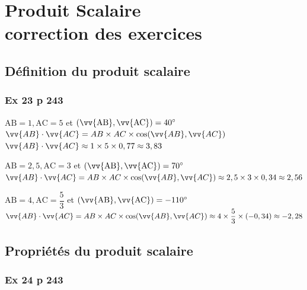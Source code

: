 \documentclass[12pt,a4paper]{book}
\begin{document}
\graphicspath{{images/}}
\setcounter{chapter}{2}
\chapter[Correction des exercices]{Produit Scalaire \\ correction des exercices}
\thispagestyle{fancy}

\section*{Définition du produit scalaire}

\subsection*{Ex 23 p 243}

\begin{enumMet}
    \item $\mathrm{AB}=1, \mathrm{AC}=5$ et $(\vv{\mathrm{AB}}, \vv{\mathrm{AC}})=40^{\circ}$\\
    $\vv{AB}\cdot\vv{AC}=AB\times AC\times\cos(\vv{AB},\vv{AC})$\\
    $\vv{AB}\cdot\vv{AC}\approx1\times5\times0,77\approx3,83$
    \item $\mathrm{AB}=2,5, \mathrm{AC}=3$ et $(\vv{\mathrm{AB}}, \vv{\mathrm{AC}})=70^{\circ}$\\
    $\vv{AB}\cdot\vv{AC}=AB\times AC\times\cos(\vv{AB},\vv{AC})\approx2,5\times3\times0,34\approx2,56$
    \item $\mathrm{AB}=4, \mathrm{AC}=\dfrac{5}{3}$ et $(\vv{\mathrm{AB}}, \vv{\mathrm{AC}})=-110^{\circ}$\\
    $\vv{AB}\cdot\vv{AC}=AB\times AC\times\cos(\vv{AB},\vv{AC})\approx4\times\dfrac{5}{3}\times(-0,34)\approx-2,28$
\end{enumMet}

\section*{Propriétés du produit scalaire}

\subsection*{Ex 24 p 243}
\end{document}
